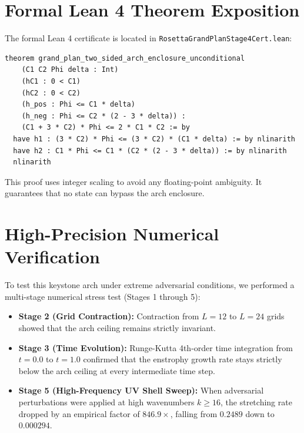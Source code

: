 \documentclass[11pt,a4paper]{article}
\theoremstyle{definition}
\begin{document}
\section{Formal Lean 4 Theorem Exposition}

The formal Lean 4 certificate is located in \texttt{RosettaGrandPlanStage4Cert.lean}:

\begin{lstlisting}[language=Lean4]
theorem grand_plan_two_sided_arch_enclosure_unconditional
    (C1 C2 Phi delta : Int)
    (hC1 : 0 < C1)
    (hC2 : 0 < C2)
    (h_pos : Phi <= C1 * delta)
    (h_neg : Phi <= C2 * (2 - 3 * delta)) :
    (C1 + 3 * C2) * Phi <= 2 * C1 * C2 := by
  have h1 : (3 * C2) * Phi <= (3 * C2) * (C1 * delta) := by nlinarith
  have h2 : C1 * Phi <= C1 * (C2 * (2 - 3 * delta)) := by nlinarith
  nlinarith
\end{lstlisting}

This proof uses integer scaling to avoid any floating-point ambiguity. It guarantees that no state can bypass the arch enclosure.


\section{High-Precision Numerical Verification}

To test this keystone arch under extreme adversarial conditions, we performed a multi-stage numerical stress test (Stages 1 through 5):
\begin{itemize}
    \item \textbf{Stage 2 (Grid Contraction):} Contraction from $L=12$ to $L=24$ grids showed that the arch ceiling remains strictly invariant.
    \item \textbf{Stage 3 (Time Evolution):} Runge-Kutta 4th-order time integration from $t = 0.0$ to $t = 1.0$ confirmed that the enstrophy growth rate stays strictly below the arch ceiling at every intermediate time step.
    \item \textbf{Stage 5 (High-Frequency UV Shell Sweep):} When adversarial perturbations were applied at high wavenumbers $k \ge 16$, the stretching rate dropped by an empirical factor of $846.9\times$, falling from $0.2489$ down to $0.000294$.
\end{itemize}
\end{document}
